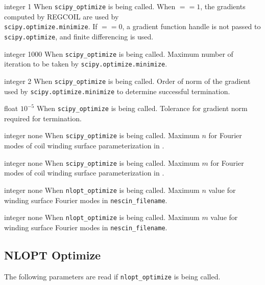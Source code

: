 \myhrule

{integer}
{1}
{When \texttt{scipy\_optimize} is being called.}
{When  $ == 1$, the gradients computed by REGCOIL are used by \\ \texttt{scipy.optimize.minimize}. If  $ == 0$, a gradient function handle is not passed to \texttt{scipy.optimize}, and finite differencing is used.}

\myhrule

{integer}
{1000}
{When \texttt{scipy\_optimize} is being called.}
{Maximum number of iteration to be taken by \texttt{scipy.optimize.minimize}.}

\myhrule

{integer}
{2}
{When \texttt{scipy\_optimize} is being called.}
{Order of norm of the gradient used by \texttt{scipy.optimize.minimize} to determine successful termination.}

\myhrule

{float}
{$10^{-5}$}
{When \texttt{scipy\_optimize} is being called.}
{Tolerance for gradient norm required for termination.}

\myhrule

{integer}
{none}
{When \texttt{scipy\_optimize} is being called.}
{Maximum $n$ for Fourier modes of coil winding surface parameterization in .}

\myhrule

{integer}
{none}
{When \texttt{scipy\_optimize} is being called.}
{Maximum $m$ for Fourier modes of coil winding surface parameterization in .}

\myhrule

{integer}
{none}
{When \texttt{nlopt\_optimize} is being called.}
{Maximum $n$ value for winding surface Fourier modes in \texttt{nescin\_filename}.}

\myhrule

{integer}
{none}
{When \texttt{nlopt\_optimize} is being called.}
{Maximum $m$ value for winding surface Fourier modes in \texttt{nescin\_filename}.}

\subsection{NLOPT Optimize}

The following parameters are read if \texttt{nlopt\_optimize} is being called. 

